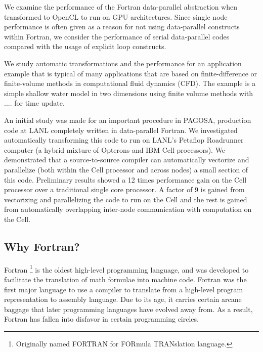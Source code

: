 \documentclass[10pt, conference, compsocconf]{IEEEtran}
\begin{document}
We examine the performance of the Fortran data-parallel abstraction when
transformed to OpenCL to run on GPU architectures.  Since single node performance
is often given as a reason for not using data-parallel constructs within Fortran,
we consider the performance of serial data-parallel codes compared with the
usage of explicit loop constructs.

We study automatic transformations and the performance for an
application example that is typical of many applications that are based on
finite-difference or finite-volume methods in computational fluid dynamics
(CFD).  The example is a simple shallow water model in two dimensions using
finite volume methods with .... for time update.

An initial study was made for an important procedure in PAGOSA,
production code at LANL completely written in data-parallel
Fortran.  We investigated automatically transforming this code
to run on LANL's Petaflop Roadrunner computer (a hybrid mixture of Opterons
and IBM Cell processors).  We demonstrated that a source-to-source compiler
can automatically vectorize and parallelize (both within the Cell processor
and across nodes) a small section of this code.  Preliminary results showed a
12 times performance gain on the Cell processor over a traditional single core
processor.  A factor of 9 is gained from vectorizing and parallelizing the
code to run on the Cell and the rest is gained from automatically overlapping
inter-node communication with computation on the Cell.



\subsection{Why Fortran?}

Fortran \footnote{Originally named FORTRAN for FORmula TRANslation language.}
is the oldest high-level programming language, and was developed to facilitate
the translation of math formulae into machine code. Fortran was the first
major language to use a compiler to translate from a high-level program
representation to assembly language. Due to its age, it carries certain arcane
baggage that later programming languages have evolved away from. As a result,
Fortran has fallen into disfavor in certain programming circles.
\end{document}
